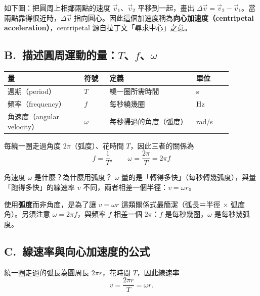 \documentclass[11pt]{article}
\begin{document}
如下圖：把圓周上相鄰兩點的速度 $\vec v_1$、$\vec v_2$ 平移到一起，畫出 $\Delta\vec v=\vec v_2-\vec v_1$。當兩點靠得很近時，$\Delta\vec v$ 指向圓心。因此這個加速度稱為\textbf{向心加速度（centripetal acceleration）}，centripetal 源自拉丁文「尋求中心」之意。


\subsection*{\sffamily B.\ 描述圓周運動的量：$T$、$f$、$\omega$}

\begin{center}
\renewcommand{\arraystretch}{1.3}
\begin{tabular}{p{0.30\linewidth} p{0.10\linewidth} p{0.34\linewidth} p{0.14\linewidth}}
\hline
\textbf{量} & \textbf{符號} & \textbf{定義} & \textbf{單位} \\
\hline
週期（period） & $T$ & 繞一圈所需時間 & s \\
頻率（frequency） & $f$ & 每秒繞幾圈 & Hz \\
角速度（angular velocity） & $\omega$ & 每秒掃過的角度（弧度） & rad/s \\
\hline
\end{tabular}
\end{center}

每繞一圈走過角度 $2\pi$（弧度）、花時間 $T$，因此三者的關係為
$$\boxed{\;f=\frac{1}{T},\qquad \omega=\frac{2\pi}{T}=2\pi f\;}$$

\begin{補充框}{角速度 $\omega$ 是什麼？為什麼用弧度？}
$\omega$ 量的是「轉得多快」（每秒轉幾弧度），與量「跑得多快」的線速率 $v$ 不同，兩者相差一個半徑：$v=\omega r$。

使用\textbf{弧度}而非角度，是為了讓 $v=\omega r$ 這類關係式最簡潔（弧長＝半徑 $\times$ 弧度角）。另須注意 $\omega=2\pi f$，與頻率 $f$ 相差一個 $2\pi$：$f$ 是每秒幾圈，$\omega$ 是每秒幾弧度。
\end{補充框}

\subsection*{\sffamily C.\ 線速率與向心加速度的公式}

繞一圈走過的弧長為圓周長 $2\pi r$，花時間 $T$，因此線速率
$$v=\frac{2\pi r}{T}=\omega r.$$
\end{document}
